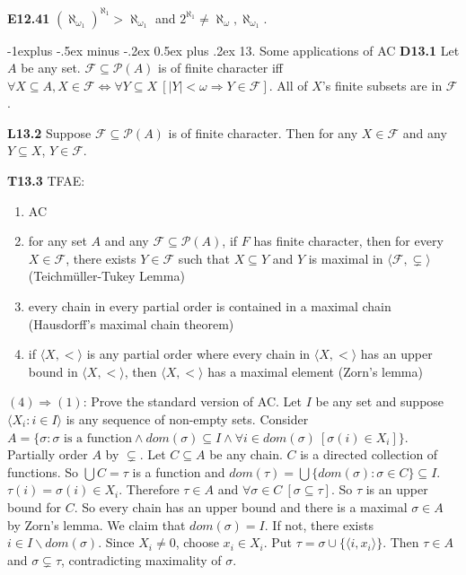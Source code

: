 \documentclass[10pt, landscape]{article}
\makeatletter
\renewcommand{\section}{\@startsection{section}{1}{0mm}%
                                {-1ex plus -.5ex minus -.2ex}%
                                {0.5ex plus .2ex}%
                                {\normalfont\large\bfseries}}
\renewcommand{\section}{\@startsection{section}{2}{0mm}%
                                {-1explus -.5ex minus -.2ex}%
                                {0.5ex plus .2ex}%
                                {\normalfont\normalsize\bfseries}}
\makeatother
\begin{document}
\begin{multicols*}{3}
\textbf{E12.41} $(\aleph_{\omega_1})^{\aleph_1}>\aleph_{\omega_1}$ and $2^{\aleph_1}\neq\aleph_\omega, \aleph_{\omega_1}$.

\section{13. Some applications of AC}
\textbf{D13.1} Let $A$ be any set. $\mathcal{F}\subseteq\mathcal{P}(A)$ is of finite character iff $\forall X \subseteq A,X\in\mathcal{F}\Longleftrightarrow \forall Y \subseteq X\ [|Y|<\omega\Longrightarrow Y\in\mathcal{F}]$. All of $X$'s finite subsets are in $\mathcal{F}$.

\textbf{L13.2} Suppose $\mathcal{F}\subseteq\mathcal{P}(A)$ is of finite character. Then for any $X\in\mathcal{F}$ and any $Y\subseteq X$, $Y\in\mathcal{F}$.

\textbf{T13.3} TFAE:
\begin{enumerate}
    \item AC
    \item for any set $A$ and any $\mathcal{F}\subseteq\mathcal{P}(A)$, if $F$ has finite character, then for every $X \in \mathcal{F}$, there exists $Y\in\mathcal{F}$ such that $X\subseteq Y$ and $Y$ is maximal in $\langle\mathcal{F},\subsetneq\rangle$ (Teichmüller-Tukey Lemma)
    \item every chain in every partial order is contained in a maximal chain (Hausdorff's maximal chain theorem)
    \item if $\langle X, < \rangle$ is any partial order where every chain in $\langle X, < \rangle$ has an upper bound in $\langle X, <\rangle$, then $\langle X, <\rangle$ has a maximal element (Zorn's lemma)
\end{enumerate}
$(4) \Longrightarrow (1)$: Prove the standard version of AC. Let $I$ be any set and suppose $\langle X_i:i \in I\rangle$ is any sequence of non-empty sets. Consider $A=\{\sigma:\sigma \text{ is a function}\land dom(\sigma)\subseteq I \land \forall i \in dom(\sigma)\ [\sigma(i)\in X_i]\}$. Partially order $A$ by $\subsetneq$. Let $C\subseteq  A$ be any chain. $C$ is a directed collection of functions. So $\bigcup C=\tau$ is a function and $dom(\tau)=\bigcup\{dom(\sigma):\sigma\in C\}\subseteq I$. $\tau(i)=\sigma(i)\in X_i$. Therefore $\tau\in A$ and $\forall \sigma \in C\ [\sigma\subseteq \tau]$. So $\tau$ is an upper bound for $C$. So every chain has an upper bound and there is a maximal $\sigma\in A$ by Zorn's lemma. We claim that $dom(\sigma)=I$. If not, there exists $i\in I \backslash dom(\sigma)$. Since $X_i\neq0$, choose $x_i\in X_i$. Put $\tau=\sigma\cup\{\langle i, x_i\rangle\}$. Then $\tau \in A$ and $\sigma \subsetneq \tau$, contradicting maximality of $\sigma$.


\end{multicols*}
\end{document}
